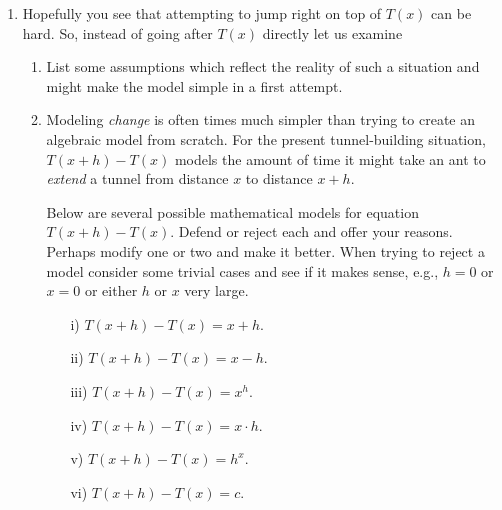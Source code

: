 \begin{lab}
\begin{enumerate}
    \item Hopefully you see that attempting to jump right on top of $T(x)$ can be hard.  So,
        instead of going after $T(x)$ directly let us examine
        \begin{enumerate}
            \item List some assumptions which reflect the reality of such a situation and
                might make the model simple in a first attempt. 
            \item Modeling {\it change} is often times much simpler than trying to create
                an algebraic model from scratch.  For the present tunnel-building
                situation, $T(x+h) - T(x)$ models the amount of time it might take an ant
                to {\it extend} a tunnel from distance $x$ to distance $x+h$.  
            
                Below are several possible mathematical models for equation
                $T(x+h)-T(x)$. Defend or reject each and offer your reasons.  Perhaps
                modify one or two and make it better. When trying to reject a model
                consider some trivial cases and see if it makes sense, e.g., $h=0$ or $x =
                0$  or either $h$ or $x$ very large.
                \begin{itemize}
                    \item [i)] $T(x+h) - T(x) = x + h$.
                    \item [ii)] $T(x+h) - T(x) = x - h$.
                    \item [iii)] $T(x+h) - T(x) = x^h$.
                    \item [iv)] $T(x+h) - T(x) = x\cdot h$.
                    \item [v)] $T(x+h) - T(x) = h^x$.
                    \item [vi)] $T(x+h) - T(x) = c$.
                \end{itemize}


        \end{enumerate}
% 
% 
% 



\end{enumerate}
\end{lab}
